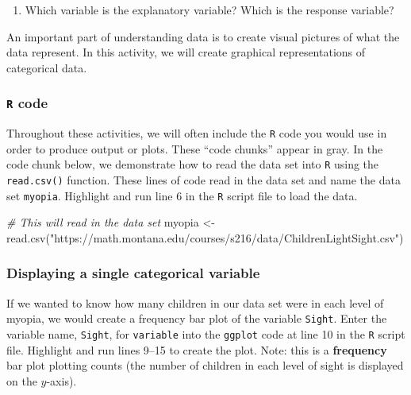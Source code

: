 \documentclass[
]{report}
\newenvironment{Shaded}{\begin{snugshade}}{\end{snugshade}}
\newcommand{\CommentTok}[1]{\textcolor[rgb]{0.56,0.35,0.01}{\textit{#1}}}
\newcommand{\FunctionTok}[1]{\textcolor[rgb]{0.00,0.00,0.00}{#1}}
\newcommand{\NormalTok}[1]{#1}
\newcommand{\OtherTok}[1]{\textcolor[rgb]{0.56,0.35,0.01}{#1}}
\newcommand{\StringTok}[1]{\textcolor[rgb]{0.31,0.60,0.02}{#1}}
\providecommand{\tightlist}{%
  \setlength{\itemsep}{0pt}\setlength{\parskip}{0pt}}
\begin{document}
\begin{enumerate}
\def\labelenumi{\arabic{enumi}.}
\tightlist
\item
  Which variable is the explanatory variable? Which is the response variable?
\end{enumerate}

\vspace{0.8in}

An important part of understanding data is to create visual pictures of what the data represent. In this activity, we will create graphical representations of categorical data.

\hypertarget{r-code}{%
\subsubsection*{\texorpdfstring{\texttt{R} code}{R code}}\label{r-code}}

Throughout these activities, we will often include the \texttt{R} code
you would use in order to produce output or plots. These
``code chunks'' appear in gray. In the code chunk below, we
demonstrate how to read the data set into \texttt{R} using the \texttt{read.csv()} function. These lines of code read in the data set and name the data set \texttt{myopia}. Highlight and run line 6 in the \texttt{R} script file to load the data.

\begin{Shaded}
\begin{Highlighting}[]
\CommentTok{\# This will read in the data set}
\NormalTok{myopia }\OtherTok{\textless{}{-}} \FunctionTok{read.csv}\NormalTok{(}\StringTok{"https://math.montana.edu/courses/s216/data/ChildrenLightSight.csv"}\NormalTok{) }
\end{Highlighting}
\end{Shaded}

\hypertarget{displaying-a-single-categorical-variable}{%
\subsubsection*{Displaying a single categorical variable}\label{displaying-a-single-categorical-variable}}

If we wanted to know how many children in our data set were in each level of myopia, we would create a frequency bar plot of the variable \texttt{Sight}. Enter the variable name, \texttt{Sight}, for \texttt{variable} into the \texttt{ggplot} code at line 10 in the \texttt{R} script file. Highlight and run lines 9--15 to create the plot. Note: this is a \textbf{frequency} bar plot plotting counts (the number of children in each level of sight is displayed on the \(y\)-axis).
\end{document}

